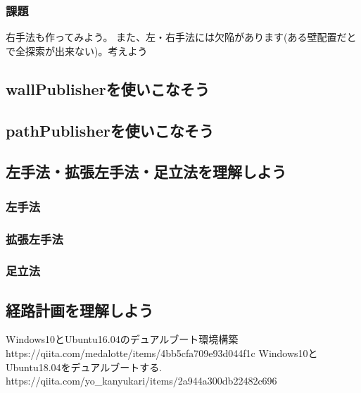 \documentclass[11pt,a4paper]{jsarticle}
\begin{document}
\subsubsection{課題}
右手法も作ってみよう。
また、左・右手法には欠陥があります(ある壁配置だとで全探索が出来ない)。考えよう


\newpage
\subsection{wallPublisherを使いこなそう}




\newpage
\subsection{pathPublisherを使いこなそう}




\newpage
\subsection{左手法・拡張左手法・足立法を理解しよう}
\subsubsection{左手法}



\newpage
\subsubsection{拡張左手法}



\subsubsection{足立法}





\newpage
\subsection{経路計画を理解しよう}



%


\begin{thebibliography}{99}
 Windows10とUbuntu16.04のデュアルブート環境構築\\https://qiita.com/medalotte/items/4bb5cfa709e93d044f1c
 Windows10とUbuntu18.04をデュアルブートする.\\https://qiita.com/yo\_kanyukari/items/2a944a300db22482c696
\end{thebibliography}%
%
\end{document}
